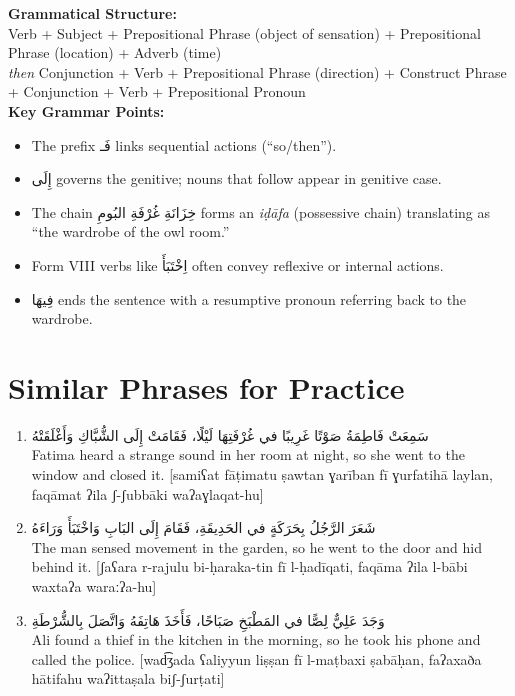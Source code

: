 \documentclass[a4paper,12pt]{article}
\begin{document}
\begin{tcolorbox}[colback=boxcolor,colframe=headercolor]
\textbf{Grammatical Structure:}\\
Verb + Subject + Prepositional Phrase (object of sensation) + Prepositional Phrase (location) + Adverb (time)\\
\hspace*{1em} \textit{then} Conjunction + Verb + Prepositional Phrase (direction) + Construct Phrase + Conjunction + Verb + Prepositional Pronoun\\[1em]
\textbf{Key Grammar Points:}
\begin{itemize}
\item The prefix \textarabic{فَـ} links sequential actions (“so/then”).
\item \textarabic{إِلَى} governs the genitive; nouns that follow appear in genitive case.
\item The chain \textarabic{خِزَانَةِ غُرْفَةِ البُومِ} forms an \textit{iḍāfa} (possessive chain) translating as “the wardrobe of the owl room.”
\item Form VIII verbs like \textarabic{اِخْتَبَأَ} often convey reflexive or internal actions.
\item \textarabic{فِيهَا} ends the sentence with a resumptive pronoun referring back to the wardrobe.
\end{itemize}
\end{tcolorbox}

\section{Similar Phrases for Practice}

\begin{enumerate}
\item \textarabic{سَمِعَتْ فَاطِمَةُ صَوْتًا غَرِيبًا في غُرْفَتِهَا لَيْلًا، فَقَامَتْ إِلَى الشُّبَّاكِ وَأَغْلَقَتْهُ}\\
Fatima heard a strange sound in her room at night, so she went to the window and closed it. [samiʕat fāṭimatu ṣawtan ɣarīban fī ɣurfatihā laylan, faqāmat ʔila ʃ-ʃubbāki waʔaɣlaqat-hu]

\item \textarabic{شَعَرَ الرَّجُلُ بِحَرَكَةٍ في الحَدِيقَةِ، فَقَامَ إِلَى البَابِ وَاخْتَبَأَ وَرَاءَهُ}\\
The man sensed movement in the garden, so he went to the door and hid behind it. [ʃaʕara r-rajulu bi-ḥaraka-tin fī l-ḥadīqati, faqāma ʔila l-bābi waxtaʔa waraːʔa-hu]

\item \textarabic{وَجَدَ عَلِيٌّ لِصًّا في المَطْبَخِ صَبَاحًا، فَأَخَذَ هَاتِفَهُ وَاتَّصَلَ بِالشُّرْطَةِ}\\
Ali found a thief in the kitchen in the morning, so he took his phone and called the police. [wad͡ʒada ʕaliyyun liṣṣan fī l-maṭbaxi ṣabāḥan, faʔaxaða hātifahu waʔittaṣala biʃ-ʃurṭati]
\end{enumerate}
\end{document}
